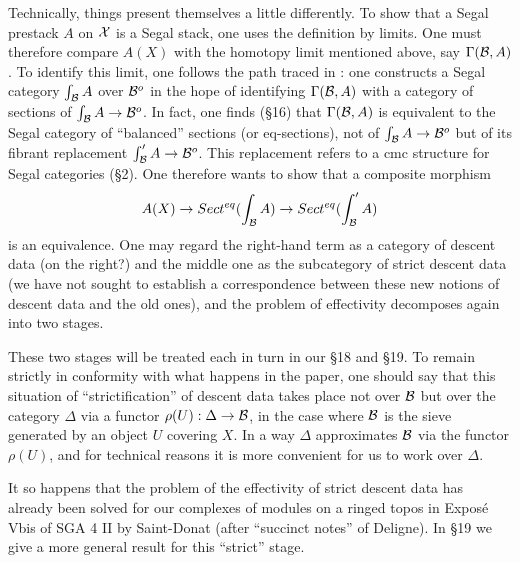Technically, things present themselves a little differently. To show that a
Segal prestack $A$ on ${\cal X}$ is a Segal stack, one uses the definition by
limits. One must therefore compare $A(X)$ with the homotopy limit mentioned
above, say $\Gamma({\cal B}, A)$. To identify this limit, one follows the path
traced in \cite{SGA1}: one constructs a Segal category $\int _{{\cal B}} A$ over
${\cal B}^o$ in the hope of identifying $\Gamma({\cal B}, A)$ with a category of
sections of $\int _{{\cal B}} A \rightarrow {\cal B}^o$. In fact, one finds (\S16) that
$\Gamma({\cal B}, A)$ is equivalent to the Segal category of ``balanced'' sections
(or eq-sections), not of $\int _{{\cal B}} A \rightarrow {\cal B}^o$ but of its fibrant
replacement $\int '_{{\cal B}} A \rightarrow {\cal B}^o$. This replacement refers to a
cmc structure for Segal categories (\S2). One therefore wants to show that a
composite morphism
$$
A(X) \rightarrow
Sect^{eq}(\int _{{\cal B}} A) \rightarrow
Sect^{eq}(\int' _{{\cal B}} A)
$$
is an equivalence. One may regard the right-hand term as a category of
descent data (on the right?) and the middle one as the subcategory of strict
descent data (we have not sought to establish a correspondence between these
new notions of descent data and the old ones), and the problem of effectivity
decomposes again into two stages.

These two stages will be treated each in turn in our \S18 and \S19. To remain
strictly in conformity with what happens in the paper, one should say that
this situation of ``strictification'' of descent data takes place not over
${\cal B}$ but over the category $\Delta$ via a functor
$\rho (U):\Delta \rightarrow {\cal B}$, in the case where ${\cal B}$ is the sieve
generated by an object $U$ covering $X$. In a way $\Delta$ approximates
${\cal B}$ via the functor $\rho (U)$, and for technical reasons it is more
convenient for us to work over $\Delta$.

It so happens that the problem of the effectivity of strict descent data has
already been solved for our complexes of modules on a ringed topos in
Exposé Vbis of SGA 4 II \cite{SGA4} by Saint-Donat (after ``succinct notes''
of Deligne). In \S19 we give a more general result for this ``strict'' stage.

